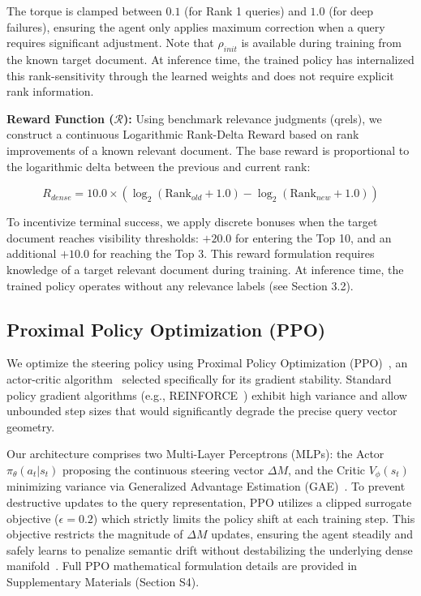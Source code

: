 \documentclass[sigconf]{acmart}
\begin{document}
The torque is clamped between $0.1$ (for Rank 1 queries) and $1.0$ (for deep failures), ensuring the agent only applies maximum correction when a query requires significant adjustment. Note that $\rho_{init}$ is available during training from the known target document. At inference time, the trained policy has internalized this rank-sensitivity through the learned weights and does not require explicit rank information.

\textbf{Reward Function ($\mathcal{R}$):} Using benchmark relevance judgments (qrels), we construct a continuous Logarithmic Rank-Delta Reward based on rank improvements of a known relevant document. The base reward is proportional to the logarithmic delta between the previous and current rank:

\begin{equation}
R_{dense} = 10.0 \times (\log_2(\text{Rank}_{old} + 1.0) - \log_2(\text{Rank}_{new} + 1.0))
\end{equation}

To incentivize terminal success, we apply discrete bonuses when the target document reaches visibility thresholds: $+20.0$ for entering the Top 10, and an additional $+10.0$ for reaching the Top 3. This reward formulation requires knowledge of a target relevant document during training. At inference time, the trained policy operates without any relevance labels (see Section 3.2).

\subsection{Proximal Policy Optimization (PPO)}

We optimize the steering policy using Proximal Policy Optimization (PPO)~\cite{schulman2017}, an actor-critic algorithm~\cite{konda1999} selected specifically for its gradient stability. Standard policy gradient algorithms (e.g., REINFORCE~\cite{williams1992}) exhibit high variance and allow unbounded step sizes that would significantly degrade the precise query vector geometry.

Our architecture comprises two Multi-Layer Perceptrons (MLPs): the Actor $\pi_\theta(a_t|s_t)$ proposing the continuous steering vector $\Delta M$, and the Critic $V_\phi(s_t)$ minimizing variance via Generalized Advantage Estimation (GAE)~\cite{schulman2016}. To prevent destructive updates to the query representation, PPO utilizes a clipped surrogate objective ($\epsilon = 0.2$) which strictly limits the policy shift at each training step. This objective restricts the magnitude of $\Delta M$ updates, ensuring the agent steadily and safely learns to penalize semantic drift without destabilizing the underlying dense manifold~\cite{engstrom2020}. Full PPO mathematical formulation details are provided in Supplementary Materials (Section S4).
\end{document}
